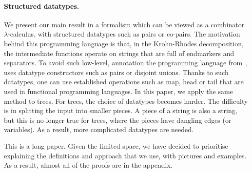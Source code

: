 \paragraph*{Structured datatypes.} We present our main result in a formalism which can be viewed as a  combinator $\lambda$-calculus, with structured datatypes such as pairs or co-pairs.  The motivation behind this programming language is that, in the  Krohn-Rhodes decomposition, the   intermediate functions  operate on strings that are full of endmarkers and separators.   To avoid such low-level, annotation the programming language from~\cite{bojanczykRegularFirstOrderList2018}, uses  datatype constructors such as pairs or disjoint unions.  Thanks to such datatypes, one can use established operations such as map, head or tail that are used in functional programming languages. 
In this paper, we apply the same method to trees.
For trees,  the choice of datatypes  becomes harder. The difficulty is in splitting the input into smaller pieces. A piece of a string is also a string, but this is no longer true for trees, where the pieces have dangling edges (or variables). As a result, more complicated  datatypes are needed.



This is a long paper. Given the limited space, we have decided to prioritise  explaining the definitions and approach that we use, with pictures and examples. As a result, almost all of the proofs are in the appendix. 



